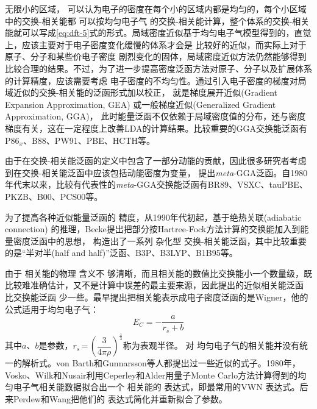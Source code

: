 {无限}小的区域，%
{可以认为}电子的密度在每个小的区域内都是均匀的，每个小区域中的交换-相关能都%
{可以按}均匀电子气%
的交换-相关能{计算}，整个体系的交换-相关能就可以写成\eqref{eq:dft-5}式的形式。局域密度近似基于均匀电子气模型得到的，直觉上，应该主要对于电子密度变化缓慢的体系{才会}是%
比较好的近似，而实际上对于原子、分子和某些价电子密度%
剧烈变化的固体，局域密度近似方法仍然能够得到比较合理的结果。不过，为了进一步提高密度泛函方法对原子、分子以及扩展体系的计算精度，应该需要考虑%
电子密度的不均匀性。通过引入电子密度的梯度对{局域近似的}交换-相关能的{泛函}形式加以校正，%
{就是}梯度展开近似(Gradient Expansion Approximation, GEA)%
{或}一般梯度近似(Generalized Gradient Approximation, GGA)，%
此时能量泛函不仅依赖于局域密度值的分布，还与密度梯度有关，这在一定程度上改善LDA的计算结果。比较重要的GGA交换能泛函有P86$_x$\cite{PRB33-8800_1986}、B88\cite{PRA38-3098_1988}、PW91\cite{PRB46-6671_1992,PRB48-4978_1993,PRB54-16533_1996,PRB57-14999_1998}、PBE\cite{PRL77-1396_1996,IBID78-1396_1997}、HCTH\cite{JCP109-6264_1998}等。

由于在交换-相关能泛函的定义中包含了一部分动能的贡献，因此很多研究者考虑{到}在交换-相关{能}泛函中应该包括动能密度为变量，%
{提出}\textit{meta}-GGA泛函。自1980年代末以来，比较有代表性的\textit{meta}-GGA交换能泛函有BR89\cite{PRA39-3761_1989}、\linebreak VSXC\cite{JCP109-400_1998}、tauPBE\cite{JCP111-911_1999}、PKZB\cite{PRL82-2544_1999,PRL82-5179_1999}、B00\cite{JCP112-4020_2000}、PCS00\cite{JCP113-10013_2000}等。

为了提高各种近似{能量}泛函的%
精度，从1990年代初起，基于绝热关联\textrm{(adiabatic connection)}%
{的推理}，Becke提出把部分按Hartree-Fock方法计算的交换能加入到能量密度泛函中的思想{，}%
构造出了一系列%
杂化型%
交换-相关{能}泛函，其中比较重要的是“半对半(half and half)”泛函\cite{JCP98-1372_1993}、B3P\cite{JCP98-5648_1993}、B3LYP\cite{JPC98-11623_1994}、B1B95\cite{JCP104-1040_1995}等。

由于%
相关能的物理%
{含}义不%
{够}清晰，而且相关能的数值比交换能小一个数量级，既比较难准确估计，又不是计算中误差的最主要来源，因此提出的{近似}相关能泛函%
比交换能泛函%
少一些。最早提出把相关能表示成电子密度泛函的是Wigner\cite{PR46-1002_1934}，他的公式适用于均匀电子气：
\begin{equation}
  E_C=-\dfrac a{r_s+b}
  \label{eq:dft-16}
\end{equation}
其中$a$、$b$是参数，$r_s$\,=\,$\left(\dfrac3{4\pi\rho}\right)^{\frac13}$称为表观半径。%
对%
均匀电子气的相关能并没有统一\linebreak 的解析式。von Barth\cite{JPC5-1629_1972}和Gunnarsson\cite{PRB13-4274_1976}等人都提出过一些近似的式子。1980年，\linebreak Vosko、Wilk和Nusair\cite{CJP58-1200_1980}利用Ceperley和Alder\cite{PRL45-566_1980}用量子Monte Carlo方法计算得到的{均匀电子气}相关能数据拟合出一个%
相关能的%
{表达}式，即最常用的VWN%
{表达}式。后来Perdew和Wang\cite{PRB45-13244_1992}把他们的%
{表达}式简化并重新拟合了参数。

